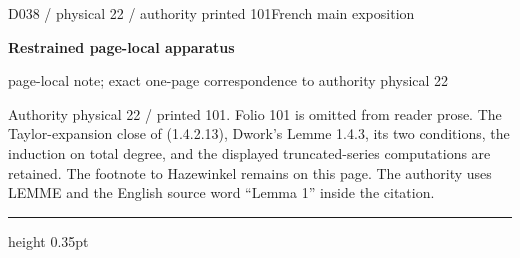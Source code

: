 \documentclass[9pt]{article}
\newcommand{\CanonText}[1]{\par{\fontsize{8.0}{9.35}\selectfont\RaggedRight #1\par}\vspace{2.2pt}}
\newcommand{\LayerTitle}{Restrained page-local apparatus}
\begin{document}
\noindent\begin{minipage}[t][\dimexpr\textheight-5pt\relax][t]{\textwidth}
{\sffamily\fontsize{7.3}{8.2}\selectfont\color{Quiet} D038 / physical 22 / authority printed 101\hfill French main exposition}
\par{}\vspace{4.5pt}
{\sffamily\fontsize{10.4}{11.6}\selectfont\bfseries\color{Accent} \LayerTitle}
\par{\sffamily\fontsize{6.7}{7.7}\selectfont\color{Quiet} page-local note; exact one-page correspondence to authority physical 22}
\vspace{5pt}
\CanonText{Authority physical 22 / printed 101. Folio 101 is omitted from reader prose. The Taylor-expansion close of (1.4.2.13), Dwork's Lemme 1.4.3, its two conditions, the induction on total degree, and the displayed truncated-series computations are retained. The footnote to Hazewinkel remains on this page. The authority uses LEMME and the English source word “Lemma 1” inside the citation.}
\vfill
{\color{Accent}\hrule height 0.35pt}\vspace{3pt}
\end{minipage}
\newpage
\end{document}
